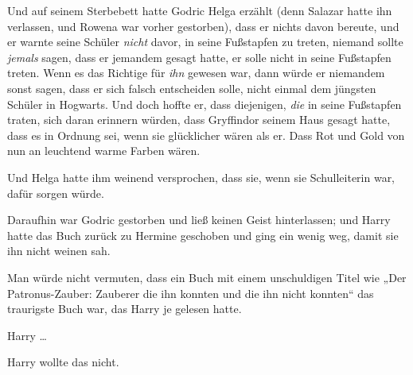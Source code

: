 Und auf seinem Sterbebett hatte Godric Helga erzählt (denn Salazar hatte ihn verlassen, und Rowena war vorher gestorben), dass er nichts davon bereute, und er warnte seine Schüler \emph{nicht} davor, in seine Fußstapfen zu treten, niemand sollte \emph{jemals} sagen, dass er jemandem gesagt hatte, er solle nicht in seine Fußstapfen treten. Wenn es das Richtige für \emph{ihn} gewesen war, dann würde er niemandem sonst sagen, dass er sich falsch entscheiden solle, nicht einmal dem jüngsten Schüler in Hogwarts. Und doch hoffte er, dass diejenigen, \emph{die} in seine Fußstapfen traten, sich daran erinnern würden, dass Gryffindor seinem Haus gesagt hatte, dass es in Ordnung sei, wenn sie glücklicher wären als er. Dass Rot und Gold von nun an leuchtend warme Farben wären.

Und Helga hatte ihm weinend versprochen, dass sie, wenn sie Schulleiterin war, dafür sorgen würde.

Daraufhin war Godric gestorben und ließ keinen Geist hinterlassen; und Harry hatte das Buch zurück zu Hermine geschoben und ging ein wenig weg, damit sie ihn nicht weinen sah.

Man würde nicht vermuten, dass ein Buch mit einem unschuldigen Titel wie
„Der Patronus-Zauber: Zauberer die ihn konnten und die ihn nicht konnten“ das traurigste Buch war, das Harry je gelesen hatte.

Harry …

Harry wollte das nicht.

